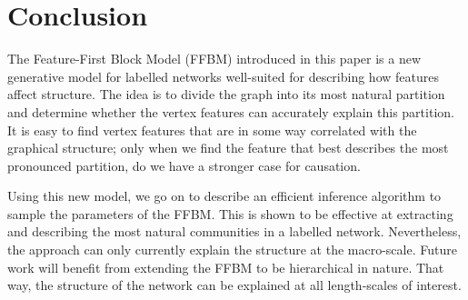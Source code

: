\section{Conclusion}
\label{sec:conclusion}

The Feature-First Block Model (FFBM) introduced 
in this paper is a new generative model for labelled networks well-suited for describing how features
affect structure. The idea is to divide the graph into its most natural partition and determine whether 
the vertex features can accurately explain this partition. 
It is easy to find vertex features that are in some way 
correlated with the graphical structure; only when 
we find the feature that best describes the most pronounced partition,
do we have a stronger case for causation.

Using this new model,
we go on to describe an efficient inference algorithm to sample 
the parameters of the FFBM. 
This is shown to be effective at extracting and describing 
the most natural communities in a labelled network. Nevertheless, the approach 
can only currently explain the structure at the macro-scale. Future work will benefit from extending 
the FFBM to be hierarchical in nature. That way, the structure of the network 
can be explained at all length-scales of interest.
